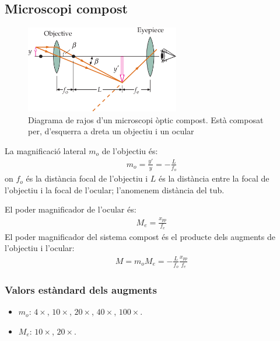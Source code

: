 \subsection{Microscopi compost}
\begin{figure}[H]
\centering
    \includegraphics[width=0.6\textwidth]{images/5/53-microscopi.png}
\caption{Diagrama de rajos d'un microscopi òptic compost. Està composat per, d'esquerra a dreta un objectiu i un ocular}
\end{figure}
La magnificació lateral $m_{o}$ de l'objectiu és:
\begin{align}
    \boxed{m_{o} = \frac{y'}{y} = - \frac{L}{f_{o}}}
\end{align}
on $f_{o}$ és la distància focal de l'objectiu i $L$ és la distància entre la focal de l'objectiu i la focal de l'ocular; l'anomenem distància del tub.

El poder magnificador de l'ocular és:
\begin{align}
    \boxed{M_{e} = \frac{x_{pp}}{f_{e}}}
\end{align}
El poder magnificador del sistema compost és el producte dels augments de l'objectiu i l'ocular:
\begin{align}
    \boxed{M = m_{o} M_{e} = - \frac{L}{f_{o}} \frac{x_{pp}}{f_{e}}}
\end{align}

\subsubsection*{Valors estàndard dels augments}
\begin{itemize}
    \item $m_{o}$: $4 \times$, $10 \times$, $20 \times$, $40 \times$, $100 \times$.
    \item $M_{e}$: $10 \times$, $20 \times$.
\end{itemize}

